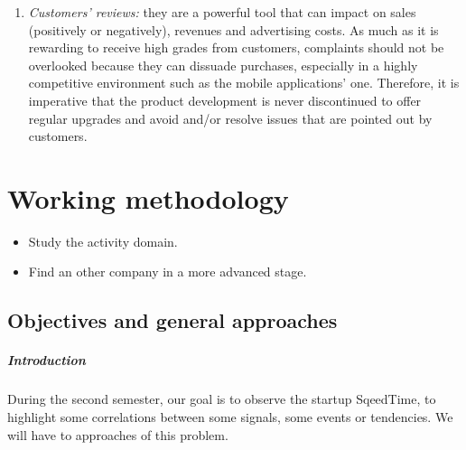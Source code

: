 \documentclass[twoside]{report}
\begin{document}
\begin{enumerate}
\item \emph{Customers' reviews:} they are a powerful tool that can impact on sales (positively or negatively), revenues and advertising costs. As much as it is rewarding to receive high grades from customers, complaints should not be overlooked because they can dissuade purchases, especially in a highly competitive environment such as the mobile applications’ one. Therefore, it is imperative that the product development is never discontinued to offer regular upgrades and avoid and/or resolve issues that are pointed out by customers.
\end{enumerate}

\chapter{Working methodology}
\begin{itemize}
	\item Study the activity domain.
	\item Find an other company in a more advanced stage.
\end{itemize}
\section{Objectives and general approaches}
\paragraph{Introduction }During the second semester, our goal is to observe the startup SqeedTime, to highlight some correlations between some signals, some events or tendencies. We will have to approaches of this problem.
\end{document}
